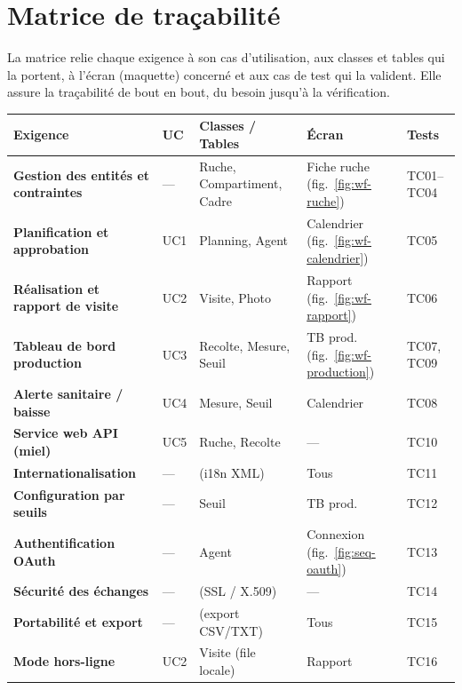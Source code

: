 \section{Matrice de traçabilité}
La matrice relie chaque exigence à son cas d'utilisation, aux classes et tables
qui la portent, à l'écran (maquette) concerné et aux cas de test qui la valident.
Elle assure la traçabilité de bout en bout, du besoin jusqu'à la vérification.
{\small
\begin{xltabular}{\textwidth}{>{\bfseries}X C{1.3cm} p{3.3cm} p{2.5cm} p{2.6cm}}
\toprule
\textbf{Exigence} & \textbf{UC} & \textbf{Classes / Tables} & \textbf{Écran} & \textbf{Tests} \\
\midrule
\endhead
Gestion des entités et contraintes & --- & Ruche, Compartiment, Cadre & Fiche ruche (fig.~\ref{fig:wf-ruche}) & TC01--TC04 \\
Planification et approbation & UC1 & Planning, Agent & Calendrier (fig.~\ref{fig:wf-calendrier}) & TC05 \\
Réalisation et rapport de visite & UC2 & Visite, Photo & Rapport (fig.~\ref{fig:wf-rapport}) & TC06 \\
Tableau de bord production & UC3 & Recolte, Mesure, Seuil & TB prod. (fig.~\ref{fig:wf-production}) & TC07, TC09 \\
Alerte sanitaire / baisse & UC4 & Mesure, Seuil & Calendrier & TC08 \\
Service web API (miel) & UC5 & Ruche, Recolte & --- & TC10 \\
Internationalisation & --- & (i18n XML) & Tous & TC11 \\
Configuration par seuils & --- & Seuil & TB prod. & TC12 \\
Authentification OAuth & --- & Agent & Connexion (fig.~\ref{fig:seq-oauth}) & TC13 \\
Sécurité des échanges & --- & (SSL / X.509) & --- & TC14 \\
Portabilité et export & --- & (export CSV/TXT) & Tous & TC15 \\
Mode hors-ligne & UC2 & Visite (file locale) & Rapport & TC16 \\
\bottomrule
\end{xltabular}}

